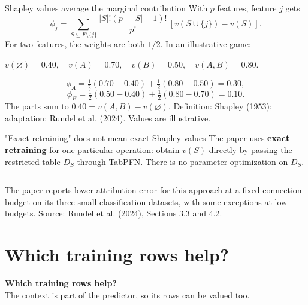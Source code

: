 \documentclass[aspectratio=169]{beamer}
\begin{document}
\begin{frame}{Shapley values average the marginal contribution}
  \small
  With $p$ features, feature $j$ gets
  \[\phi_j=\sum_{S\subseteq F\setminus\{j\}}
    \frac{|S|!(p-|S|-1)!}{p!}\,[v(S\cup\{j\})-v(S)].\]
  \vskip 6pt
  For two features, the weights are both $1/2$. In an illustrative game:
  \vskip 5pt
  \begin{center}
    $v(\varnothing)=0.40,\quad v(A)=0.70,\quad
      v(B)=0.50,\quad v(A,B)=0.80.$
  \end{center}
  \vskip 5pt
  \[\phi_A=\tfrac12(0.70-0.40)+\tfrac12(0.80-0.50)=\boxed{0.30},\]
  \[\phi_B=\tfrac12(0.50-0.40)+\tfrac12(0.80-0.70)=\boxed{0.10}.\]
  The parts sum to $0.40=v(A,B)-v(\varnothing)$.
  \vskip 3pt
  {\scriptsize Definition: Shapley (1953); adaptation: Rundel et al. (2024). Values are illustrative.}
\end{frame}

\begin{frame}{"Exact retraining" does not mean exact Shapley values}
  \small
  The paper uses \textbf{exact retraining} for one particular operation:
  obtain $v(S)$ directly by passing the restricted table $D_S$ through TabPFN.
  There is no parameter optimization on $D_S$.
  \vskip 9pt
  \begin{columns}[T]
  \end{columns}
  \vskip 10pt
  The paper reports lower attribution error for this approach at a fixed
  connection budget on its three small classification datasets, with some
  exceptions at low budgets.
  \vskip 4pt
  {\scriptsize Source: Rundel et al. (2024), Sections 3.3 and 4.2.}
\end{frame}

\section{Which training rows help?}
\begin{frame}[plain]
  \vfill\centering
  {\Large\color{popblue}\textbf{Which training rows help?}}\\[9pt]
  {\small The context is part of the predictor, so its rows can be valued too.}
  \vfill
\end{frame}
\end{document}
